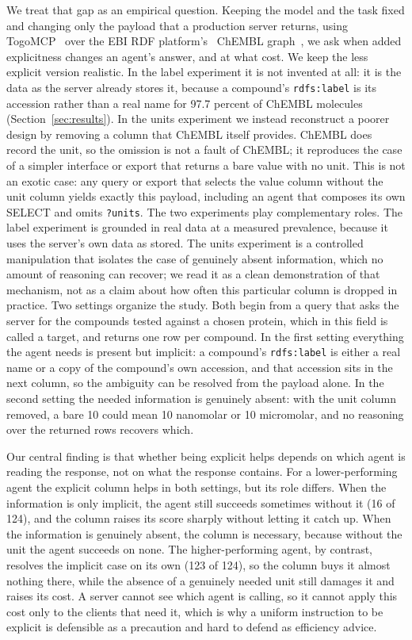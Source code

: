 \documentclass[sigconf]{ceurart}
\begin{document}
We treat that gap as an empirical question. Keeping the model and the task fixed
and changing only the payload that a production server returns, using
TogoMCP~\cite{kinjo2026togomcp} over the EBI RDF platform's~\cite{jupp2014ebirdf}
ChEMBL graph~\cite{zdrazil2024chembl}, we ask when added explicitness changes an
agent's answer, and at what cost. We keep the less explicit version realistic. In
the label experiment it is not invented at all: it is the data as the server already
stores it, because a compound's \texttt{rdfs:label} is its accession rather than a
real name for 97.7 percent of ChEMBL molecules (Section~\ref{sec:results}). In the
units experiment we instead reconstruct a poorer design by removing a column that ChEMBL
itself provides. ChEMBL does record the unit, so the omission is not a fault of
ChEMBL; it reproduces the case of a simpler interface or export that returns a bare
value with no unit. This is not an exotic case: any query or export that selects the
value column without the unit column yields exactly this payload, including an agent
that composes its own SELECT and omits \texttt{?units}. The two experiments play
complementary roles. The label experiment is grounded in real data at a measured prevalence, because it
uses the server's own data as stored. The units experiment is a controlled
manipulation that isolates the case of genuinely absent information, which no
amount of reasoning can recover; we read it as a clean demonstration of that
mechanism, not as a claim about how often this particular column is dropped in
practice. Two settings organize the study. Both begin from a query that
asks the server for the compounds tested against a chosen protein, which in this
field is called a target, and returns one row per compound. In the first setting
everything the agent needs is present but implicit: a compound's
\texttt{rdfs:label} is either a real name or a copy of the compound's own
accession, and that accession sits in the next column, so the ambiguity can be
resolved from the payload alone. In the second setting the needed information is
genuinely absent: with the unit column removed, a bare 10 could mean 10 nanomolar
or 10 micromolar, and no reasoning over the returned rows recovers which.

Our central finding is that whether being explicit helps depends on which agent is
reading the response, not on what the response contains. For a lower-performing
agent the explicit column helps in both settings, but its role differs. When the
information is only implicit, the agent still succeeds sometimes without it (16 of
124), and the column raises its score sharply without letting it catch up. When
the information is genuinely absent, the column is necessary, because without the
unit the agent succeeds on none. The higher-performing agent, by contrast,
resolves the implicit case on its own (123 of 124), so the column buys it almost
nothing there, while the absence of a genuinely needed unit still damages it and
raises its cost. A server cannot see which agent is calling, so it cannot apply
this cost only to the clients that need it, which is why a uniform instruction to
be explicit is defensible as a precaution and hard to defend as efficiency advice.
\end{document}

